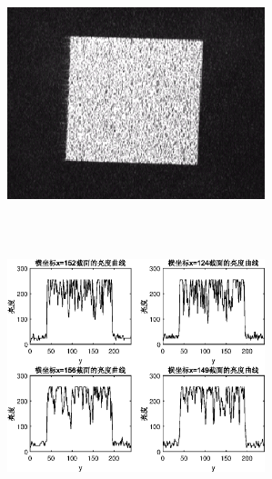 \documentclass[UTF8]{ctexart}
\makeatletter
\newcommand{\figcaption}{\def\@captype{figure}\caption}
\makeatother
\begin{document}
\begin{center}
			\includegraphics[width=7.5cm,height=7.5cm]{YUANaddDOEangel5.eps}
			\includegraphics[width=7.5cm,height=7.5cm]{addDOEangel5.eps}
			\figcaption{加DOE的CCD捕捉图和光亮度曲线(角度5)}\label{addDOEangel5}
			

\end{center}
\end{document}
